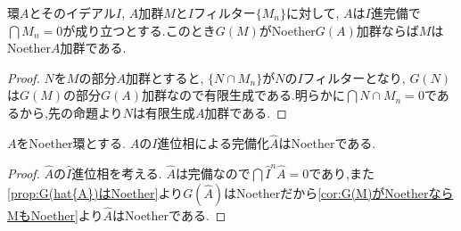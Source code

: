 \begin{cor}\label{cor:G(M)がNoetherならMもNoether}
	環$A$とそのイデアル$I$, $A$加群$M$と$I$フィルター$\{M_n\}$に対して, $A$は$I$進完備で$\bigcap M_n=0$が成り立つとする.このとき$G(M)$がNoether$G(A)$加群ならば$M$はNoether$A$加群である.
\end{cor}

\begin{proof}
	$N$を$M$の部分$A$加群とすると, $\{N\cap M_n\}$が$N$の$I$フィルターとなり, $G(N)$は$G(M)$の部分$G(A)$加群なので有限生成である.明らかに$\bigcap N\cap M_n=0$であるから,先の命題より$N$は有限生成$A$加群である.
\end{proof}

\begin{thm}
	$A$をNoether環とする. $A$の$I$進位相による完備化$\widehat{A}$はNoetherである.
\end{thm}

\begin{proof}
	$\widehat{A}$の$\widehat{I}$進位相を考える.	$\widehat{A}$は完備なので$\bigcap \widehat{I}^n\widehat{A}=0$であり,また\ref{prop:G(hat{A})はNoether}より$G(\widehat{A})$はNoetherだから\ref{cor:G(M)がNoetherならMもNoether}より$\widehat{A}$はNoetherである.
\end{proof}
